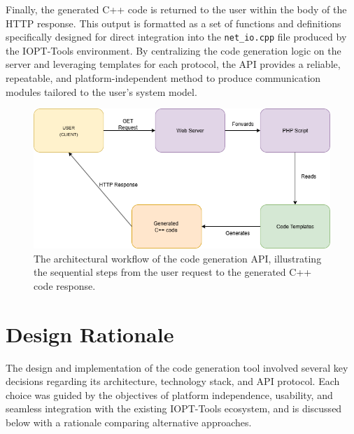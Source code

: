 Finally, the generated C++ code is returned to the user within the body of the HTTP response. This output is formatted as a set of functions and definitions specifically designed for direct integration into the \texttt{net\_io.cpp} file produced by the IOPT-Tools environment. By centralizing the code generation logic on the server and leveraging templates for each protocol, the API provides a reliable, repeatable, and platform-independent method to produce communication modules tailored to the user’s system model.

\begin{figure}[h!]
   \centering
   \includegraphics[width=1\textwidth]{Chapters/Figures/apiWorkflow.png}
   \caption{The architectural workflow of the code generation API, illustrating the sequential steps from the user request to the generated C++ code response.}
   \label{fig:api_Workflow}
\end{figure}



\section{Design Rationale}
\label{sec:design_rationale}


The design and implementation of the code generation tool involved several key decisions regarding its architecture, technology stack, and API protocol. Each choice was guided by the objectives of platform independence, usability, and seamless integration with the existing IOPT-Tools ecosystem, and is discussed below with a rationale comparing alternative approaches.

